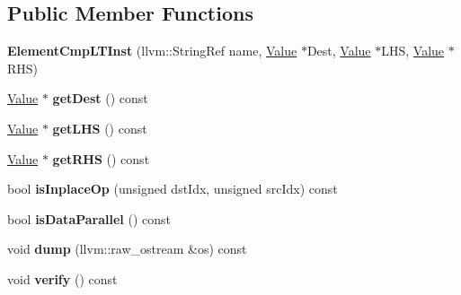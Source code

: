 \subsection*{Public Member Functions}
\begin{DoxyCompactItemize}
\item 
\mbox{\label{classglow_1_1_element_cmp_l_t_inst_a06929564d524ad82fba0be365bcd8fde}} 
{\bfseries Element\+Cmp\+L\+T\+Inst} (llvm\+::\+String\+Ref name, \hyperlink{classglow_1_1_value}{Value} $\ast$Dest, \hyperlink{classglow_1_1_value}{Value} $\ast$L\+HS, \hyperlink{classglow_1_1_value}{Value} $\ast$R\+HS)
\item 
\mbox{\label{classglow_1_1_element_cmp_l_t_inst_a48ea0c212b51635812636afaa1ad0883}} 
\hyperlink{classglow_1_1_value}{Value} $\ast$ {\bfseries get\+Dest} () const
\item 
\mbox{\label{classglow_1_1_element_cmp_l_t_inst_a868fbca1bfc1f6445792e11e1d1d2b99}} 
\hyperlink{classglow_1_1_value}{Value} $\ast$ {\bfseries get\+L\+HS} () const
\item 
\mbox{\label{classglow_1_1_element_cmp_l_t_inst_a62b5c5da2671f2546fa00def810cb2b2}} 
\hyperlink{classglow_1_1_value}{Value} $\ast$ {\bfseries get\+R\+HS} () const
\item 
\mbox{\label{classglow_1_1_element_cmp_l_t_inst_aaa69541c2fc268fd9f71f203d91e9f96}} 
bool {\bfseries is\+Inplace\+Op} (unsigned dst\+Idx, unsigned src\+Idx) const
\item 
\mbox{\label{classglow_1_1_element_cmp_l_t_inst_a944d50cad1b7186e19be55527188031f}} 
bool {\bfseries is\+Data\+Parallel} () const
\item 
\mbox{\label{classglow_1_1_element_cmp_l_t_inst_ad82c599df4d12e24eb3b66d43d672b4a}} 
void {\bfseries dump} (llvm\+::raw\+\_\+ostream \&os) const
\item 
\mbox{\label{classglow_1_1_element_cmp_l_t_inst_a431de56a541de31359041ec3810eac27}} 
void {\bfseries verify} () const
\end{DoxyCompactItemize}
